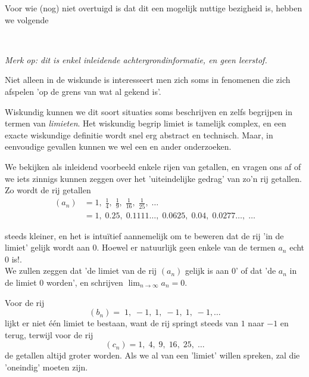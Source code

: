 \documentclass{ximera}
\begin{document}
\begin{expandable}
Voor wie (nog) niet overtuigd is dat dit een mogelijk nuttige bezigheid is, hebben we volgende


\begin{uitweiding} \ 
	
\textit{Merk op: dit is enkel inleidende achtergrondinformatie, en geen leerstof.
}

Niet alleen in de wiskunde is interesseert men zich soms in fenomenen die zich afspelen 'op de grens van wat al gekend is'. %

Wiskundig kunnen we dit soort situaties soms beschrijven en zelfs begrijpen in termen van \textit{limieten}. Het wiskundig begrip limiet is tamelijk complex, en een exacte wiskundige definitie wordt snel erg abstract en technisch. Maar, in eenvoudige gevallen kunnen we wel een en ander onderzoeken.

We bekijken als inleidend voorbeeld enkele rijen van getallen, en vragen ons af of we iets zinnigs kunnen zeggen over het 'uiteindelijke gedrag' van zo'n rij getallen. Zo wordt de rij getallen
\begin{align*}
(a_n) & = 1, \;\frac{1}{4}, \;\frac{1}{9}, \;\frac{1}{16},\;\frac{1}{25},\;\dots\\
                                & =1,\; 0.25,\;  0.1111\dots,\; 0.0625,\; 0.04,\; 0.0277\dots,\; \dots
\end{align*}

steeds kleiner, en het is intuïtief aannemelijk om te beweren dat de rij 'in de limiet' gelijk wordt aan $0$. Hoewel er natuurlijk geen enkele van de termen $a_n$ echt $0$ is!. \\
We zullen zeggen dat 'de limiet van de rij $(a_n)$ gelijk is aan $0$' of dat 'de $a_n$ in de limiet $0$ worden', en schrijven $\lim_{n\to\infty}a_n = 0$.

Voor de rij 
\[
(b_n) = \;1,\;-1,\;1,\;-1,\;1,\;-1,\dots
\]
lijkt er niet één limiet te bestaan, want de rij springt steeds van $1$ naar $-1$ en terug, 
terwijl voor de rij 
\[
(c_n) = 1,\;4,\;9,\;16,\;25,\;\dots
\]
de getallen altijd groter worden. Als we al van een 'limiet' willen spreken, zal die 'oneindig' moeten zijn.


\end{uitweiding}
\end{expandable}
\end{document}
